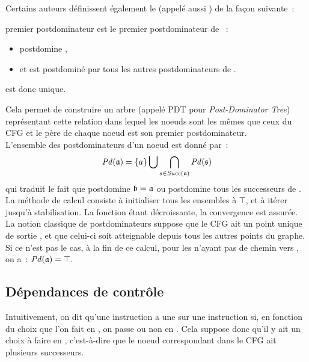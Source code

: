 Certains auteurs définissent également
le 
(appelé aussi )
de la façon suivante~:

\begin{definition}{premier postdominateur}
   est le premier postdominateur de  \ssi~:
\begin{itemize}
  \item {} postdomine ,
  \item et  est postdominé par tous les autres postdominateurs de .
\end{itemize}
 est donc unique.
\end{definition}

Cela permet de construire un arbre (appelé PDT pour {\it Post-Dominator Tree})
représentant cette relation dans lequel les noeuds sont les mêmes que
ceux du CFG et le père de chaque noeud est son premier postdominateur.\\

L'ensemble des postdominateurs d'un noeud  est donné par~:
$$
\mathit{Pd}(\mathfrak{a}) = \{a\} \bigcup \bigcap_{s \in \mathit{Succ}(\mathfrak{a})} \mathit{Pd}(\mathfrak{s})
$$
qui traduit le fait que  postdomine  \ssi $\mathfrak{b} = \mathfrak{a}$
ou  postdomine tous les successeurs de .
La méthode de calcul consiste à initialiser tous les ensembles à $\top$,
et à itérer jusqu'à stabilisation.
La fonction étant décroissante, la convergence est assurée.\\


La notion classique de postdominateurs suppose que le CFG ait un point unique de
sortie \nE,
et que celui-ci soit atteignable depuis tous les autres points du graphe.
Si ce n'est pas le cas, à la fin de ce calcul,
pour les  n'ayant pas de chemin vers \nE, on a~: $\mathit{Pd}(\mathfrak{a}) = \top$.\\


\subsection{Dépendances de contrôle}

Intuitivement, on dit qu'une instruction  a une  sur une instruction 
si, en fonction du choix que l'on fait en , on passe ou non en .
Cela suppose donc qu'il y ait un choix à faire en ,
c'est-à-dire que le noeud correspondant dans le CFG
ait plusieurs successeurs.\\

